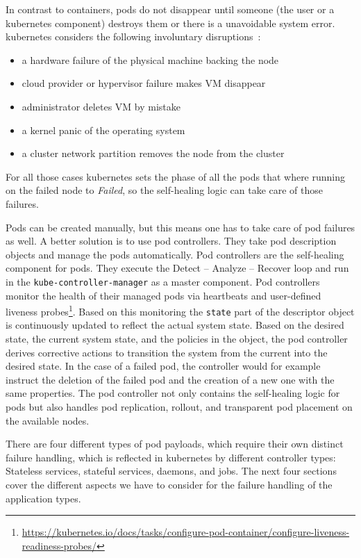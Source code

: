   In contrast to containers, pods do not disappear until someone (the user or a \gls{kubernetes} component) destroys them or there is a unavoidable system error.
  \Gls{kubernetes} considers the following involuntary disruptions~\cite{kubernetes}:

  \begin{itemize}
    \item a hardware failure of the physical machine backing the node
    \item cloud provider or hypervisor failure makes VM disappear
    \item administrator deletes VM by mistake
    \item a kernel panic of the operating system
    \item a cluster network partition removes the node from the cluster
  \end{itemize}

  For all those cases \gls{kubernetes} sets the phase of all the pods that where running on the failed node to \textit{Failed}, so the self-healing logic can take care of those failures.

  Pods can be created manually, but this means one has to take care of pod failures as well.
  A better solution is to use pod controllers.
  They take pod description objects and manage the pods automatically.
  Pod controllers are the self-healing component for pods.
  They execute the Detect -- Analyze -- Recover loop and run in the \texttt{kube-controller-manager} as a master component.
  Pod controllers monitor the health of their managed pods via heartbeats and user-defined liveness probes\footnote{\url{https://kubernetes.io/docs/tasks/configure-pod-container/configure-liveness-readiness-probes/}}.
  Based on this monitoring the \texttt{state} part of the descriptor object is continuously updated to reflect the actual system state.
  Based on the desired state, the current system state, and the policies in the object, the pod controller derives corrective actions to transition the system from the current into the desired state.
  In the case of a failed pod, the controller would for example instruct the deletion of the failed pod and the creation of a new one with the same properties.
  The pod controller not only contains the self-healing logic for pods but also handles pod replication, rollout, and transparent pod placement on the available nodes.

  There are four different types of pod payloads, which require their own distinct failure handling, which is reflected in \gls{kubernetes} by different controller types:
  Stateless services, stateful services, daemons, and jobs.
  The next four sections cover the different aspects we have to consider for the failure handling of the application types.

